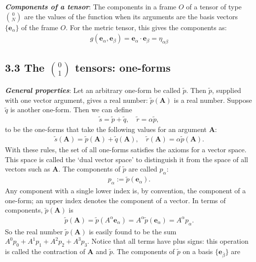 \documentclass[11pt,letterpaper]{book}
\begin{document}
        \textit{\textbf{Components of a tensor}}: The components in a frame \(O\) of a tensor of type $\binom{0}{N}$ are the values of the function when its arguments are the basis vectors \(\{ \mathbf{e}_\alpha \}\) of the frame \(O\). For the metric tensor, this gives the components as:
         \begin{align}
         g(\mathbf{e}_\alpha, \mathbf{e}_\beta) = \mathbf{e}_\alpha \cdot \mathbf{e}_\beta = \eta_{\alpha\beta} \tag{3.5}
         \end{align}

    \subsection{3.3 The \(\binom{0}{1}\) tensors: one-forms}

    \textit{\textbf{General properties}}: Let an arbitrary one-form be called \(\tilde{p}\). Then \(\tilde{p}\), supplied with one vector argument, gives a real number: \(\tilde{p}(\mathbf{A})\) is a real number. Suppose \(\tilde{q}\) is another one-form. Then we can define
    \begin{align}
    \tilde{s} = \tilde{p} + \tilde{q}, \quad \tilde{r} = \alpha \tilde{p},
    \end{align}
    to be the one-forms that take the following values for an argument \(\mathbf{A}\):
    \begin{align}
    \tilde{s}(\mathbf{A}) = \tilde{p}(\mathbf{A}) + \tilde{q}(\mathbf{A}), \quad \tilde{r}(\mathbf{A}) = \alpha \tilde{p}(\mathbf{A}).
    \end{align}
    With these rules, the set of all one-forms satisfies the axioms for a vector space. This space is called the ‘dual vector space’ to distinguish it from the space of all vectors such as \(\mathbf{A}\).
    The components of \(\tilde{p}\) are called \(p_\alpha\):
    \begin{align}
    p_\alpha := \tilde{p}(\mathbf{e}_\alpha). \tag{3.7}
    \end{align}
    Any component with a single lower index is, by convention, the component of a one-form; an upper index denotes the component of a vector. In terms of components, \(\tilde{p}(\mathbf{A})\) is
    \begin{align}
    \tilde{p}(\mathbf{A}) = \tilde{p}(A^\alpha \mathbf{e}_\alpha)
    = A^\alpha \tilde{p}(\mathbf{e}_\alpha)= A^\alpha p_\alpha. \tag{3.8}
    \end{align}
    So the real number \(\tilde{p}(\mathbf{A})\) is easily found to be the sum \(A^0p_0 + A^1p_1 + A^2p_2 + A^3p_3\). Notice that all terms have plus signs: this operation is called the contraction of \(\mathbf{A}\) and \(\tilde{p}\). The components of \(\tilde{p}\) on a basis \(\{\mathbf{e}_{\bar{\beta}}\}\) are
\end{document}
